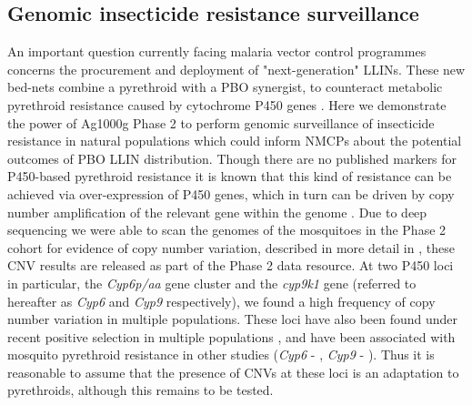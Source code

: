 \documentclass[a4paper,11pt,abstracton,hidelinks]{scrartcl}
\begin{document}
\subsection*{Genomic insecticide resistance surveillance}

%
An important question currently facing malaria vector control programmes concerns the procurement and deployment of "next-generation" LLINs.
%
These new bed-nets combine a pyrethroid with a PBO synergist, to counteract metabolic pyrethroid resistance caused by cytochrome P450 genes \cite{churcher2016, killeen2018, toe2018}.
%
Here we demonstrate the power of Ag1000g Phase 2 to perform genomic surveillance of insecticide resistance in natural populations which could inform NMCPs about the potential outcomes of PBO LLIN distribution.
%
Though there are no published markers for P450-based pyrethroid resistance it is known that this kind of resistance can be achieved via over-expression of P450 genes, which in turn can be driven by copy number amplification of the relevant gene within the genome \cite{riveron2014, muller2008}.
%
Due to deep sequencing we were able to scan the genomes of the mosquitoes in the Phase 2 cohort for evidence of copy number variation, described in more detail in \cite{lucas2019}, these CNV results are released as part of the Phase 2 data resource.
%
At two P450 loci in particular, the \textit{Cyp6p/aa} gene cluster and the \textit{cyp9k1} gene (referred to hereafter as \textit{Cyp6} and \textit{Cyp9} respectively), we found a high frequency of copy number variation in multiple populations.
%
These loci have also been found under recent positive selection in multiple populations \cite{Ag1000gConsortium2017}, and have been associated with mosquito pyrethroid resistance in other studies (\textit{Cyp6} - \cite{nikou2003, edi2014, faucon2015, main2018}, \textit{Cyp9} - \cite{main2018, tchigossou2018, vontas2018}).
%
Thus it is reasonable to assume that the presence of CNVs at these loci is an adaptation to pyrethroids, although this remains to be tested.
\end{document}
